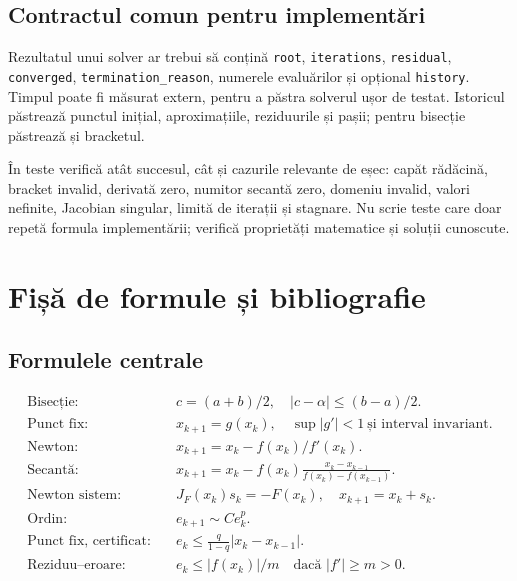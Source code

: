 \documentclass[11pt,a4paper]{article}
\begin{document}
\subsection{Contractul comun pentru implementări}
Rezultatul unui solver ar trebui să conțină \texttt{root}, \texttt{iterations}, \texttt{residual}, \texttt{converged}, \texttt{termination\_reason}, numerele evaluărilor și opțional \texttt{history}. Timpul poate fi măsurat extern, pentru a păstra solverul ușor de testat. Istoricul păstrează punctul inițial, aproximațiile, reziduurile și pașii; pentru bisecție păstrează și bracketul.

În teste verifică atât succesul, cât și cazurile relevante de eșec: capăt rădăcină, bracket invalid, derivată zero, numitor secantă zero, domeniu invalid, valori nefinite, Jacobian singular, limită de iterații și stagnare. Nu scrie teste care doar repetă formula implementării; verifică proprietăți matematice și soluții cunoscute.

\newpage
\section{Fișă de formule și bibliografie}
\small
\subsection{Formulele centrale}
\begin{align*}
\text{Bisecție:}\quad &c=(a+b)/2,\quad |c-\alpha|\le(b-a)/2.\\
\text{Punct fix:}\quad &x_{k+1}=g(x_k),\quad \sup|g'|<1\ \text{și interval invariant}.\\
\text{Newton:}\quad &x_{k+1}=x_k-f(x_k)/f'(x_k).\\
\text{Secantă:}\quad &x_{k+1}=x_k-f(x_k)\frac{x_k-x_{k-1}}{f(x_k)-f(x_{k-1})}.\\
\text{Newton sistem:}\quad &J_F(x_k)s_k=-F(x_k),\quad x_{k+1}=x_k+s_k.\\
\text{Ordin:}\quad &e_{k+1}\sim C e_k^p.\\
\text{Punct fix, certificat:}\quad &e_k\le\frac{q}{1-q}|x_k-x_{k-1}|.\\
\text{Reziduu--eroare:}\quad &e_k\le |f(x_k)|/m\quad\text{dacă }|f'|\ge m>0.
\end{align*}
\end{document}
